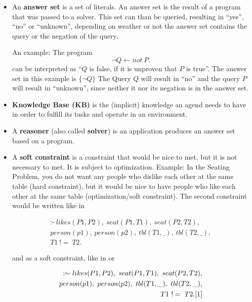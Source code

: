 \documentclass[runningheads]{llncs}
\newcommand{\ASPif}{\textrm{:-}}
\begin{document}
\begin{itemize}
    \item An \textbf{answer set} \cite{gelfond1991classical} is a set of literals. An answer set is the result of a program that was passed to a solver. This set can than be queried, resulting in ``yes'', ``no'' or ``unknown'', depending on weather or not the answer set contains the query or the negation of the query. 
    
    An example: The program  $$\neg Q \leftarrow not ~ P. $$ can be interpreted as ``$Q$ is false, if it is unproven that $P$ is true''. The answer set in this example is $\{\neg Q\}$ The Query $Q$ will result in ``no'' and the query $P$ will result in ``unknown'', since neither it nor its negation is in the answer set.
    \item \textbf{Knowledge Base (KB)} is the (implicit) knowledge an agend needs to have in order to fulfill its tasks and operate in an environment.
    \item A \textbf{reasoner} (also called \textbf{solver}) is an application produces an answer set based on a program.
    \item A \textbf{soft constraint} is a constraint that would be nice to met, but it is not necessary to met. It is subject to optimization. Example: In the Seating Problem, you do not want any people who dislike each other at the same table (hard constraint), but it would be nice to have people who like each other at the same table (optimization/soft constraint).  The second constraint would be written like in  
    
    \begin{equation}
    \label{formula:hardConstraint}
\begin{split}
\ASPif ~ likes(P1,P2), ~ seat(P1,T1), ~ seat(P2,T2),\\
  person(p1), ~ person(p2), ~ tbl(T1,\_), ~ tbl(T2,\_),\\
  T1 ~ != ~ T2.
\end{split}
\end{equation}

and as a soft constraint, like in  or 

\begin{equation}
    \label{formula:softConstraint}
\begin{split}
\textrm{:$\sim$}~ likes(P1,P2), ~ seat(P1,T1), ~ seat(P2,T2),\\
  person(p1), ~ person(p2), ~ tbl(T1,\_), ~ tbl(T2,\_),\\
  T1 ~ != ~ T2. [1]
\end{split}
\end{equation}


\end{itemize}
\end{document}
